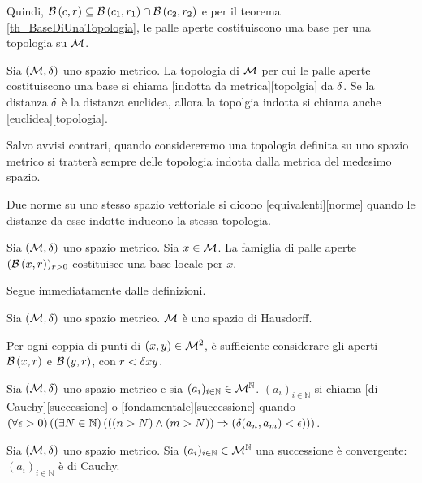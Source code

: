 Quindi, $\mathcal{B}\left (c,r \right) \subseteq
\mathcal{B}\left (c_1,r_1 \right) \cap \mathcal{B}\left (c_2,r_2 \right)$ e per il teorema
\ref{th_BaseDiUnaTopologia}, le palle aperte costituiscono una base per
una topologia su $\mathcal{M}$. \EndProof
\begin{Definition}
	Sia $(\mathcal{M},\delta)$ uno spazio metrico.
	La topologia di $\mathcal{M}$ per cui le palle aperte
	costituiscono una base si chiama
	[indotta da metrica][topolgia] da
	$\delta$. Se la distanza $\delta$ \`e la distanza euclidea,
	allora la topolgia indotta si chiama anche
	[euclidea][topologia].
\end{Definition}
\par Salvo avvisi contrari, quando considereremo una topologia definita su uno spazio metrico si tratter\`a sempre delle topologia indotta dalla metrica del medesimo spazio. 
\begin{Definition}
  Due norme su uno stesso spazio vettoriale si dicono
  [equivalenti][norme]
  quando le distanze da esse indotte inducono la stessa topologia.
\end{Definition}
\begin{Theorem}
	Sia $(\mathcal{M},\delta)$ uno spazio metrico.
	Sia $x \in \mathcal{M}$. La famiglia di palle aperte $(\mathcal{B}\left (x,r \right))_{r > 0}$ costituisce una base locale per $x$.
\end{Theorem}
\Proof Segue immediatamente dalle definizioni. \EndProof
\begin{Theorem}
	Sia $(\mathcal{M},\delta)$ uno spazio metrico.
	$\mathcal{M}$ \`e uno spazio di Hausdorff.
\end{Theorem}
\Proof Per ogni coppia di punti di $(x,y) \in \mathcal{M}^2$, \`e sufficiente considerare gli aperti $\mathcal{B}\left (x,r \right)$ e $\mathcal{B}\left (y,r \right)$, con $r < \delta{x}{y}$. \EndProof
\begin{Definition}
	Sia $(\mathcal{M},\delta)$ uno spazio metrico e sia $(a_i)_{i \in \mathbb{N}} \in \mathcal{M}^\mathbb{N}$. $(a_i)_{i \in \mathbb{N}}$ si chiama [di Cauchy][successione] o [fondamentale][successione] quando $\left ( \forall \epsilon > 0 \right ) \left ( \left ( \exists N \in \mathbb{N} \right ) \left ( \left ( \left ( n > N \right ) \wedge \left ( m > N \right ) \right ) \Rightarrow \left ( \delta(a_n,a_m) < \epsilon \right ) \right ) \right )$.
\end{Definition}
\begin{Theorem}
	Sia $(\mathcal{M},\delta)$ uno spazio metrico.
	Sia $(a_i)_{i \in \mathbb{N}} \in \mathcal{M}^\mathbb{N}$ una successione \`e convergente: $(a_i)_{i \in \mathbb{N}}$ \`e di Cauchy.
\end{Theorem}
